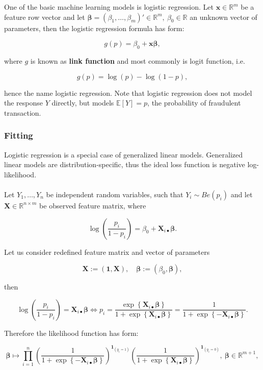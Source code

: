 \documentclass[12pt, a4paper]{report}
\newcommand{\R}{\mathbb{R}}
\newcommand{\E}{\mathbb{E}}
\theoremstyle{plain}
\theoremstyle{plain}
\theoremstyle{remark}
\begin{document}
One of the basic machine learning models is logistic regression. Let $\pmb{x}\in\R^{m}$ be a feature row vector and let $\pmb{\beta}=(\beta_1,\ldots,\beta_m)'\in\R^{m},\ \beta_0\in\R$ an unknown vector of parameters, then the logistic regression formula has form:

$$
g(p) = \beta_0 + \pmb{x}\pmb{\beta},
$$

where $g$ is known as \textbf{link function} and most commonly is logit function, i.e.

$$
g(p) = \log(p) - \log(1-p),
$$

hence the name logistic regression. Note that logistic regression does not model the response $Y$ directly, but models $\E[Y]=p$, the probability of fraudulent transaction.

\subsubsection{Fitting}
\label{subsubsec:mlt_sml_lr_fitting}

Logistic regression is a special case of generalized linear models. Generalized linear models are distribution-specific, thus the ideal loss function is negative log-likelihood.\\
\\
Let $Y_1,\ldots,Y_n$ be independent random variables, such that $Y_i\sim Be(p_i)$ and let $\pmb{X}\in\R^{n\times m}$ be observed feature matrix, where

$$
\log\left(\frac{p_i}{1-p_i}\right) = \beta_0 + \pmb{X}_{i\bullet}\pmb{\beta}.
$$

Let us consider redefined feature matrix and vector of parameters

$$
\pmb{X} := \left( \pmb{1}, \pmb{X} \right),\quad \pmb{\beta} := (\beta_0, \pmb{\beta}),
$$

then 

\begin{equation}
\label{eq:mlt_sml_lr_f_prob_relation}
\log\left(\frac{p_i}{1-p_i}\right) = \pmb{X}_{i\bullet}\pmb{\beta} \Leftrightarrow p_i = \frac{\exp\left\{\pmb{X}_{i\bullet}\pmb{\beta}\right\}}{1+\exp\left\{\pmb{X}_{i\bullet}\pmb{\beta}\right\}}=\frac{1}{1+\exp\left\{-\pmb{X}_{i\bullet}\pmb{\beta}\right\}}.
\end{equation}

Therefore the likelihood function has form:

$$
\pmb{\beta} \mapsto \prod_{i=1}^n \left(\frac{1}{1+\exp\left\{-\pmb{X}_{i\bullet}\pmb{\beta}\right\}}\right)^{\textbf{1}_{(y_i=1)}}\left(\frac{1}{1+\exp\left\{\pmb{X}_{i\bullet}\pmb{\beta}\right\}}\right)^{\textbf{1}_{(y_i=0)}},\ \pmb{\beta}\in\R^{m+1},
$$
\end{document}
